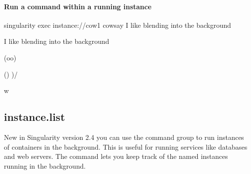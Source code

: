 \documentclass[letterpaper,10pt,english]{sphinxmanual}
\begin{document}
\paragraph{Run a command within a running instance}
\label{\detokenize{appendix:run-a-command-within-a-running-instance}}
%
\begin{sphinxVerbatim}[commandchars=\\\{\}]
\PYGZdl{} singularity exec instance://cow1 cowsay \PYGZdq{}I like blending into the background\PYGZdq{}

 \PYGZus{}\PYGZus{}\PYGZus{}\PYGZus{}\PYGZus{}\PYGZus{}\PYGZus{}\PYGZus{}\PYGZus{}\PYGZus{}\PYGZus{}\PYGZus{}\PYGZus{}\PYGZus{}\PYGZus{}\PYGZus{}\PYGZus{}\PYGZus{}\PYGZus{}\PYGZus{}\PYGZus{}\PYGZus{}\PYGZus{}\PYGZus{}\PYGZus{}\PYGZus{}\PYGZus{}\PYGZus{}\PYGZus{}\PYGZus{}\PYGZus{}\PYGZus{}\PYGZus{}\PYGZus{}\PYGZus{}\PYGZus{}\PYGZus{}

\PYGZlt{} I like blending into the background \PYGZgt{}

 \PYGZhy{}\PYGZhy{}\PYGZhy{}\PYGZhy{}\PYGZhy{}\PYGZhy{}\PYGZhy{}\PYGZhy{}\PYGZhy{}\PYGZhy{}\PYGZhy{}\PYGZhy{}\PYGZhy{}\PYGZhy{}\PYGZhy{}\PYGZhy{}\PYGZhy{}\PYGZhy{}\PYGZhy{}\PYGZhy{}\PYGZhy{}\PYGZhy{}\PYGZhy{}\PYGZhy{}\PYGZhy{}\PYGZhy{}\PYGZhy{}\PYGZhy{}\PYGZhy{}\PYGZhy{}\PYGZhy{}\PYGZhy{}\PYGZhy{}\PYGZhy{}\PYGZhy{}\PYGZhy{}\PYGZhy{}

        \PYGZbs{}   \PYGZca{}\PYGZus{}\PYGZus{}\PYGZca{}

         \PYGZbs{}  (oo)\PYGZbs{}\PYGZus{}\PYGZus{}\PYGZus{}\PYGZus{}\PYGZus{}\PYGZus{}\PYGZus{}

            (\PYGZus{}\PYGZus{})\PYGZbs{}       )\PYGZbs{}/\PYGZbs{}

                \textbar{}\textbar{}\PYGZhy{}\PYGZhy{}\PYGZhy{}\PYGZhy{}w \textbar{}

                \textbar{}\textbar{}     \textbar{}\textbar{}
\end{sphinxVerbatim}


\subsection{instance.list}
\label{\detokenize{appendix:instance-list}}\label{\detokenize{appendix:sec-instancelist}}
New in Singularity version 2.4 you can use the  command group to run
instances of containers in the background. This is useful for running
services like databases and web servers. The  command lets you keep track
of the named instances running in the background.
\end{document}
